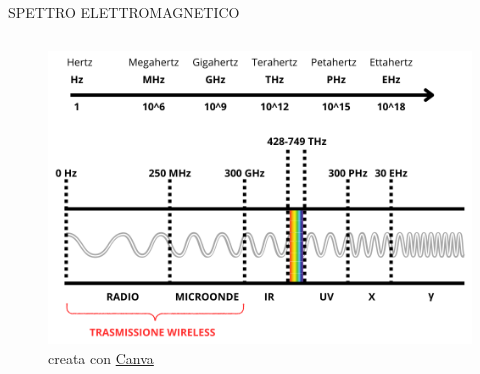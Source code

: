 \documentclass[aspectratio=1610]{beamer}
\begin{document}
\begin{frame}{SPETTRO ELETTROMAGNETICO}
    \begin{columns}
        \begin{figure}
            \includegraphics[width=\textwidth]{img/Spettro_Elettromagnetico.png}
            \caption{{creata con \href{https://www.canva.com/}{Canva}}}
        \end{figure}
    \end{columns}
\end{frame}
\end{document}
